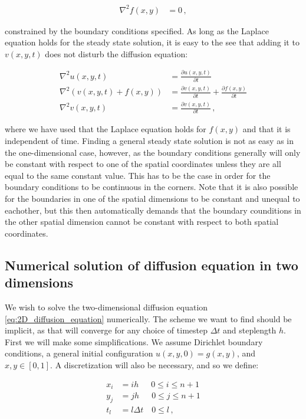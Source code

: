 \documentclass[reprint,english,notitlepage]{revtex4-1}  %
\begin{document}
\begin{align*}
\nabla^2 f(x,y) &= 0 \, ,
\end{align*}

constrained by the boundary conditions specified. As long as the Laplace equation holds for the steady state solution, it is easy to the see that adding it to $v(x,y,t)$ does not disturb the diffusion equation:

\begin{align*}
\nabla^2 u(x,y,t) &= \frac{\partial u(x,y,t)}{\partial t} \\
\nabla^2 (v(x,y,t) + f(x,y) ) &= \frac{\partial v(x,y,t)}{\partial t} + \frac{\partial f(x,y)}{\partial t} \\
\nabla^2 v(x,y,t) &= \frac{\partial v(x,y,t)}{\partial t} \, ,
\end{align*}

where we have used that the Laplace equation holds for $f(x,y)$ and that it is independent of time. Finding a general steady state solution is not as easy as in the one-dimensional case, however, as the boundary conditions generally will only be constant with respect to one of the spatial coordinates unless they are all equal to the same constant value. This has to be the case in order for the boundary conditions to be continuous in the corners. Note that it is also possible for the boundaries in one of the spatial dimensions to be constant and unequal to eachother, but this then automatically demands that the boundary counditions in the other spatial dimension cannot be constant with respect to both spatial coordinates.





\subsection{Numerical solution of diffusion equation in two dimensions} \label{sec:formalism_2D_diff_eq_numerical}

We wish to solve the two-dimensional diffusion equation \eqref{eq:2D_diffusion_equation} numerically. The scheme we want to find should be implicit, as that will converge for any choice of timestep $\Delta t$ and steplength $h$. First we will make some simplifications. We assume Dirichlet boundary conditions, a general initial configuration $u(x,y,0) = g(x,y)$, and $x,y\in[0,1]$. A discretization will also be necessary, and so we define:

\begin{align*}
x_i &= i h \,\,\,\quad 0 \leq i \leq n+1 \\
y_j &= j h \,\,\,\quad 0 \leq j \leq n+1 \\
t_l &= l \Delta t \quad 0 \leq l \, ,
\end{align*}
\end{document}
